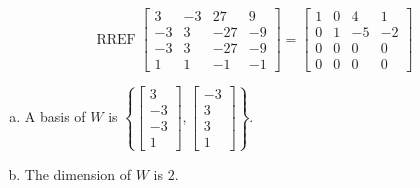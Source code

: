 \begin{exerciseAnswer} 


\[\operatorname{RREF} \left[\begin{array}{cccc}
3 & -3 & 27 & 9 \\
-3 & 3 & -27 & -9 \\
-3 & 3 & -27 & -9 \\
1 & 1 & -1 & -1
\end{array}\right] = \left[\begin{array}{cccc}
1 & 0 & 4 & 1 \\
0 & 1 & -5 & -2 \\
0 & 0 & 0 & 0 \\
0 & 0 & 0 & 0
\end{array}\right] \]


\begin{enumerate}[(a)]
\item A basis of \(W\) is \( \left\{ \left[\begin{array}{c}
3 \\
-3 \\
-3 \\
1
\end{array}\right] , \left[\begin{array}{c}
-3 \\
3 \\
3 \\
1
\end{array}\right] \right\} \).
\item The dimension of \(W\) is \( 2 \).
\end{enumerate}
    
\end{exerciseAnswer}
    
